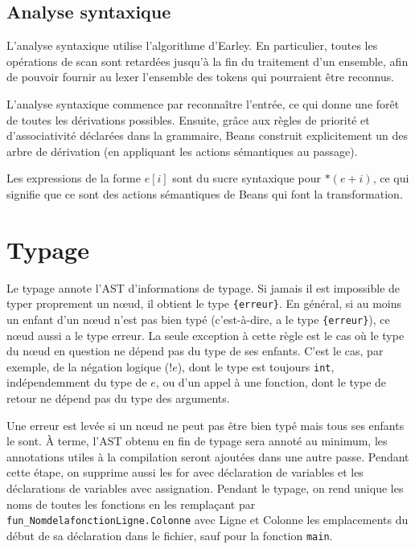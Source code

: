 \documentclass{scrartcl}
\begin{document}
\subsection*{Analyse syntaxique}
L'analyse syntaxique utilise l'algorithme d'Earley. En particulier, toutes les
opérations de scan sont retardées jusqu'à la fin du traitement d'un ensemble,
afin de pouvoir fournir au lexer l'ensemble des tokens qui pourraient être
reconnus.\par
L'analyse syntaxique commence par reconnaître l'entrée, ce qui donne une forêt
de toutes les dérivations possibles. Ensuite, grâce aux règles de priorité et
d'associativité déclarées dans la grammaire, Beans construit explicitement
un des arbre de dérivation (en appliquant les actions sémantiques au passage).\par
Les expressions de la forme \(e[i]\) sont du sucre syntaxique pour \(*(e+i)\),
ce qui signifie que ce sont des actions sémantiques de Beans qui font la
transformation.

\section*{Typage}
Le typage annote l'AST d'informations de typage. Si jamais il est impossible
de typer proprement un n\oe{}ud, il obtient le type \verb|{erreur}|. En général,
si au moins un enfant d'un n\oe{}ud n'est pas bien typé (c'est-à-dire, a le type
\verb|{erreur}|), ce n\oe{}ud aussi a le type erreur. La seule exception à cette règle
est le cas où le type du n\oe{}ud en question ne dépend pas du type de ses enfants.
C'est le cas, par exemple, de la négation logique ($!e$), dont le type est
toujours \verb|int|, indépendemment du type de $e$, ou d'un appel à une fonction,
dont le type de retour ne dépend pas du type des arguments.\par
Une erreur est levée si un n\oe{}ud ne peut pas être bien typé mais tous ses enfants
le sont. À terme, l'AST obtenu en fin de typage sera annoté au minimum, les annotations
utiles à la compilation seront ajoutées dans une autre passe. Pendant cette étape,
on supprime aussi les for avec déclaration de variables et les déclarations de variables
avec assignation. Pendant le typage, on rend unique les noms de toutes
les fonctions en les remplaçant par \verb|fun_NomdelafonctionLigne.Colonne| avec Ligne et Colonne les
emplacements du début de sa déclaration dans le fichier, sauf pour la fonction \verb|main|.
\end{document}
